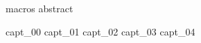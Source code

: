 \documentclass[12pt,a4paper,oneside,english]{book}
\begin{document}




\runfrontend{}

{macros}
{abstract}

\sumario

\listadefiguras

\listadetabelas


	\listadesimbolos

	\listadeacronimos

	\listadenotacoes

\markboth{}{}

\mainmatter 
\setcounter{page}{1} \pagestyle{plain} 

{capt_00}
{capt_01}
{capt_02}
{capt_03}
{capt_04}



%
% 
%


\end{document}
